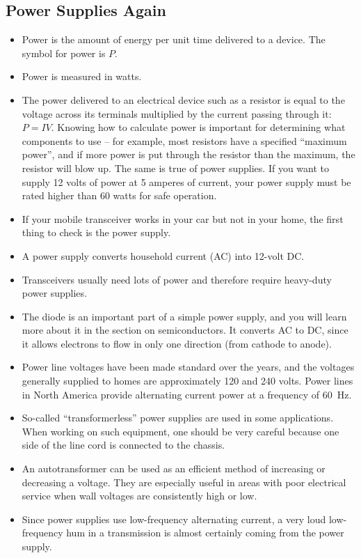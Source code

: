 \documentclass[letterpaper,12pt]{scrartcl}
\begin{document}
\subsection{Power Supplies Again}

\begin{itemize}
\item Power is the amount of energy per unit time delivered to a device. 
The symbol for power is $P$.
\item Power is measured in watts.
\item The power delivered to an electrical device such as a resistor 
is equal to the voltage across its terminals multiplied by the current passing through it: $P = IV$.
Knowing how to calculate power is important for determining what components to use -- for example,
most resistors have a specified ``maximum power'', and if more power is put through the resistor than the maximum,
the resistor will blow up. The same is true of power supplies. If you want to supply 12 volts of power at 5 amperes of current,
your power supply must be rated higher than 60 watts for safe operation.
\item If your mobile transceiver works in your car but not in your home, the first thing to check is the power supply.
\item A power supply converts household current (AC) into 12-volt DC.
\item Transceivers usually need lots of power and therefore require heavy-duty power supplies.
\item The diode is an important part of a simple power supply, and you will learn more about it in the section on semiconductors.
It converts AC to DC, since it allows electrons to flow in only one direction (from cathode to anode).
\item Power line voltages have been made standard over the years, and the voltages generally supplied to homes
are approximately 120 and 240 volts. Power lines in North America provide alternating current power at a frequency of 60~Hz.
\item So-called ``transformerless'' power supplies are used in some applications. When working on such equipment, one should be
very careful because one side of the line cord is connected to the chassis.
\item An autotransformer can be used as an efficient method of increasing or decreasing a voltage. They are especially useful in areas
with poor electrical service when wall voltages are consistently high or low.
\item Since power supplies use low-frequency alternating current, a very loud low-frequency hum in a transmission is almost certainly
coming from the power supply.
\end{itemize}
\end{document}
